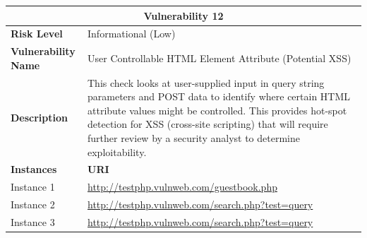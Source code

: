 \documentclass[12pt]{article}
\begin{document}
\begin{center}
\renewcommand{\arraystretch}{1.3}
\begin{longtable}{|l|p{10cm}|}
\hline
\multicolumn{2}{|c|}{\textbf{Vulnerability 12}} \\
\hline
\textbf{Risk Level} & Informational (Low) \\
\hline
\textbf{Vulnerability Name} & User Controllable HTML Element Attribute (Potential XSS) \\
\hline
\textbf{Description} & This check looks at user-supplied input in query string parameters and POST data to identify where certain HTML attribute values might be controlled. This provides hot-spot detection for XSS (cross-site scripting) that will require further review by a security analyst to determine exploitability. \\
\hline
\textbf{Instances} & \textbf{URI} \\
\hline
Instance 1 & \url{http://testphp.vulnweb.com/guestbook.php} \\
\hline
Instance 2 & \url{http://testphp.vulnweb.com/search.php?test=query} \\
\hline
Instance 3 & \url{http://testphp.vulnweb.com/search.php?test=query} \\
\hline
\end{longtable}
\end{center}\vspace{0.7cm}
\end{document}
